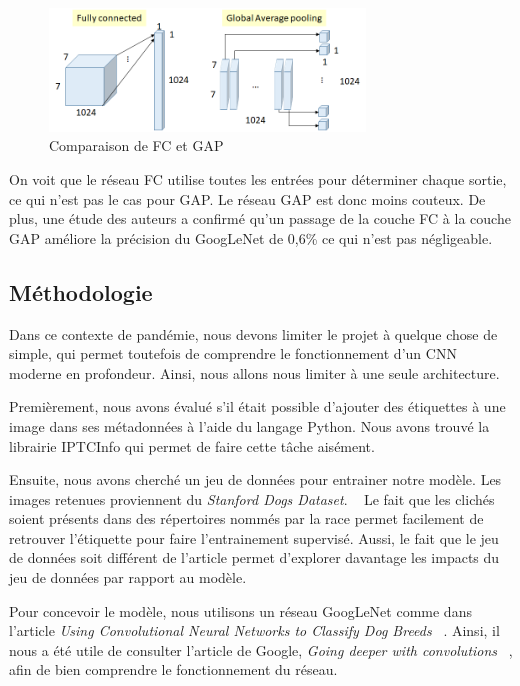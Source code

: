 \documentclass{article}
\begin{document}
\begin{figure}[htbp]
    \includegraphics[width=8.4cm]{./figures/Figure4.png} 
    \caption{Comparaison de FC et GAP}
    \label{7} 
\end{figure} 

On voit que le réseau FC utilise toutes les entrées pour déterminer chaque
sortie, ce qui n'est pas le cas pour GAP. Le réseau GAP est donc moins couteux.
De plus, une étude des auteurs a confirmé qu'un passage de la couche FC à la couche
GAP améliore la précision du GoogLeNet de 0,6\% ce qui n'est pas négligeable.
~\cite{tsang_2018}

\subsection{Méthodologie}
Dans ce contexte de pandémie, nous devons limiter le projet à quelque chose 
de simple, qui permet toutefois de comprendre le fonctionnement d'un CNN 
moderne en profondeur. Ainsi, nous allons nous limiter à une seule architecture.

Premièrement, nous avons évalué s'il était possible d'ajouter des étiquettes à une
image dans ses métadonnées à l'aide du langage Python. Nous avons trouvé la
librairie IPTCInfo qui permet de faire cette tâche aisément.

Ensuite, nous avons cherché un jeu de données pour entrainer notre modèle. Les
images retenues proviennent du \textit{Stanford Dogs Dataset}. 
~\cite{KhoslaYaoJayadevaprakashFeiFei_FGVC2011} Le fait que les clichés soient
présents dans des répertoires nommés par la race permet facilement de retrouver
l'étiquette pour faire l'entrainement supervisé. Aussi, le fait que le jeu de
données soit différent de l'article permet d'explorer davantage les impacts du
jeu de données  par rapport au modèle.

Pour concevoir le modèle, nous utilisons un réseau GoogLeNet comme dans l'article 
\textit{Using Convolutional Neural Networks to Classify Dog Breeds} 
~\cite{output}. Ainsi, il nous a été utile de consulter l'article de Google,
\textit{Going deeper with convolutions} ~\cite{43022}, afin de bien comprendre
le fonctionnement du réseau.
\end{document}
